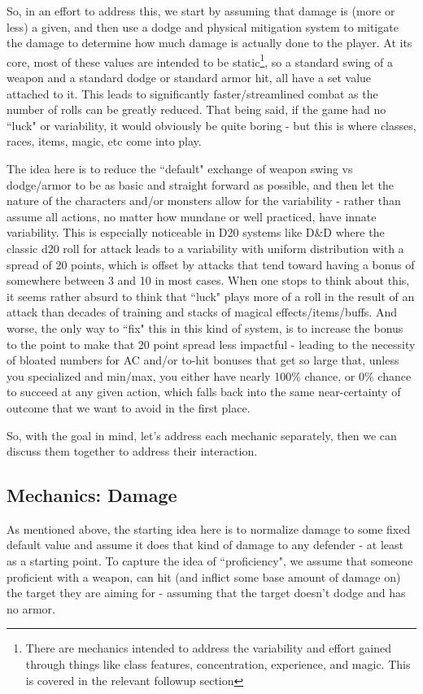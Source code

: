 \documentclass{article}
\begin{document}
        So, in an effort to address this, we start by assuming that damage is (more or less) a given, and then use a dodge and physical mitigation system to mitigate the damage to determine how much damage is actually done to the player. At its core, most of these values are intended to be static\footnote{There are mechanics intended to address the variability and effort gained through things like class features, concentration, experience, and magic. This is covered in the relevant followup section}, so a standard swing of a weapon and a standard dodge or standard armor hit, all have a set value attached to it. This leads to significantly faster/streamlined combat as the number of rolls can be greatly reduced. That being said, if the game had no ``luck" or variability, it would obviously be quite boring - but this is where classes, races, items, magic, etc come into play. 
        
        The idea here is to reduce the ``default" exchange of weapon swing vs dodge/armor to be as basic and straight forward as possible, and then let the nature of the characters and/or monsters allow for the variability - rather than assume all actions, no matter how mundane or well practiced, have innate variability. This is especially noticeable in D20 systems like D\&D where the classic d20 roll for attack leads to a variability with uniform distribution with a spread of 20 points, which is offset by attacks that tend toward having a bonus of somewhere between 3 and 10 in most cases. When one stops to think about this, it seems rather absurd to think that ``luck" plays more of a roll in the result of an attack than decades of training and stacks of magical effects/items/buffs. And worse, the only way to ``fix" this in this kind of system, is to increase the bonus to the point to make that 20 point spread less impactful - leading to the necessity of bloated numbers for AC and/or to-hit bonuses that get so large that, unless you specialized and min/max, you either have nearly 100\% chance, or 0\% chance to succeed at any given action, which falls back into the same near-certainty of outcome that we want to avoid in the first place.
        
        So, with the goal in mind, let's address each mechanic separately, then we can discuss them together to address their interaction.
        
    \subsection{Mechanics: Damage}
        As mentioned above, the starting idea here is to normalize damage to some fixed default value and assume it does that kind of damage to any defender - at least as a starting point. To capture the idea of ``proficiency", we assume that someone proficient with a weapon, can hit (and inflict some base amount of damage on) the target they are aiming for - assuming that the target doesn't dodge and has no armor. 
        
\end{document}
